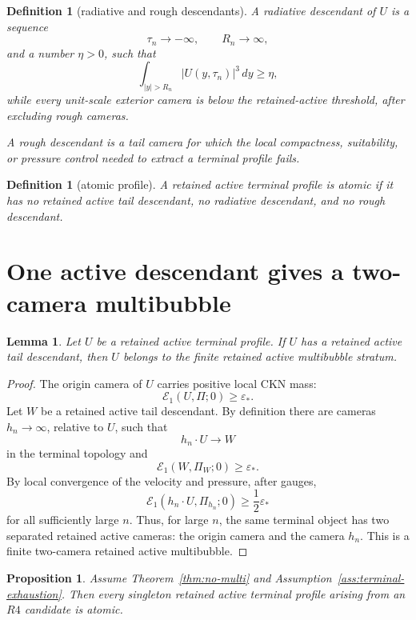 \documentclass[11pt]{article}
\numberwithin{equation}{section}
\newtheorem{lemma}[theorem]{Lemma}
\newtheorem{proposition}[theorem]{Proposition}
\newtheorem{definition}[theorem]{Definition}
\newcommand{\eps}{\varepsilon}
\newcommand{\cE}{\mathcal E}
\begin{document}
\begin{definition}[radiative and rough descendants]
A radiative descendant of \(U\) is a sequence
\[
  \tau_n\to-\infty,\qquad R_n\to\infty,
\]
and a number \(\eta>0\), such that
\[
  \int_{|y|>R_n}|U(y,\tau_n)|^3\,dy\ge\eta,
  \label{eq:radiative}
\]
while every unit-scale exterior camera is below the retained-active threshold,
after excluding rough cameras.

A rough descendant is a tail camera for which the local compactness,
suitability, or pressure control needed to extract a terminal profile fails.
\end{definition}

\begin{definition}[atomic profile]
A retained active terminal profile is atomic if it has no retained active tail
descendant, no radiative descendant, and no rough descendant.
\end{definition}

\section{One active descendant gives a two-camera multibubble}

\begin{lemma}
\label{lem:desc-to-multi}
Let \(U\) be a retained active terminal profile.  If \(U\) has a retained
active tail descendant, then \(U\) belongs to the finite retained active
multibubble stratum.
\end{lemma}

\begin{proof}
The origin camera of \(U\) carries positive local CKN mass:
\[
  \cE_1(U,\Pi;0)\ge\eps_*.
\]
Let \(W\) be a retained active tail descendant.  By definition there are
cameras \(h_n\to\infty\), relative to \(U\), such that
\[
  h_n\cdot U\to W
\]
in the terminal topology and
\[
  \cE_1(W,\Pi_W;0)\ge\eps_*.
\]
By local convergence of the velocity and pressure, after gauges,
\[
  \cE_1(h_n\cdot U,\Pi_{h_n};0)\ge \frac12\eps_*
\]
for all sufficiently large \(n\).  Thus, for large \(n\), the same terminal
object has two separated retained active cameras: the origin camera and the
camera \(h_n\).  This is a finite two-camera retained active multibubble.
\end{proof}

\begin{proposition}
\label{prop:no-multi-implies-atomic}
Assume Theorem~\ref{thm:no-multi} and
Assumption~\ref{ass:terminal-exhaustion}.  Then every singleton retained active
terminal profile arising from an \(R4\) candidate is atomic.
\end{proposition}
\end{document}
